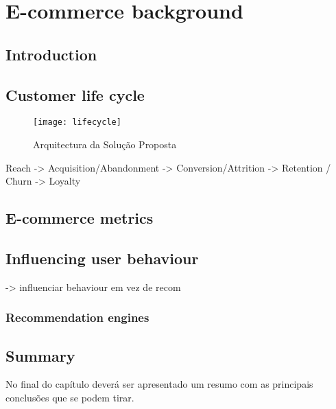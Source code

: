 \chapter{E-commerce background} \label{chap:sota}

\section*{}



\section{Introduction}



\section{Customer life cycle}

\begin{figure}[t]
  \begin{center}
    \leavevmode
    \texttt{[image: lifecycle]}
    \caption{Arquitectura da Solução Proposta}
    \label{fig:lifecycle}
  \end{center}
\end{figure}

Reach -> Acquisition/Abandonment -> Conversion/Attrition -> Retention / Churn -> Loyalty

\section{E-commerce metrics}

\cite{Sterne2000}

\section{Influencing user behaviour}

-> influenciar behaviour em vez de recom

\subsection{Recommendation engines}

\cite{Adomavicius2005}

\section{Summary}

No final do capítulo deverá ser apresentado um resumo com as 
principais conclusões que se podem tirar. 
